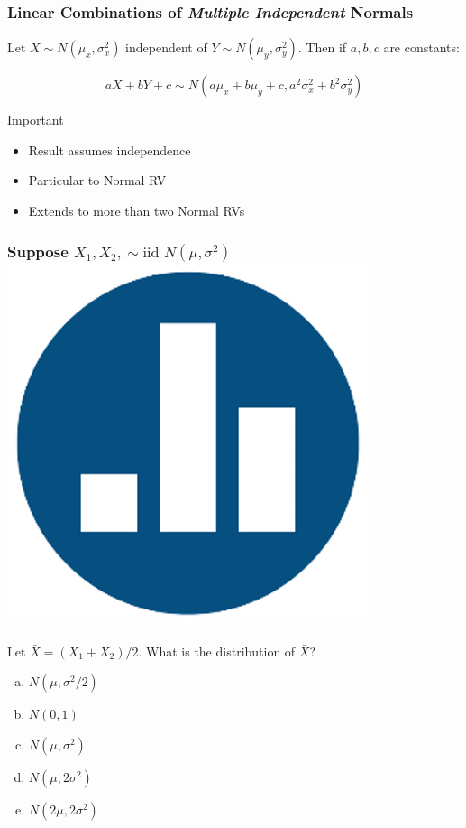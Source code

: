\documentclass[handout]{beamer}
\begin{document}
\begin{frame}
  \frametitle{Linear Combinations of \emph{Multiple Independent} Normals}
Let $X \sim N(\mu_x, \sigma^2_x)$ independent of $Y \sim N(\mu_y, \sigma^2_y)$. Then if $a,b,c$ are constants:

$$\boxed{aX + bY +c \sim N(a\mu_x + b\mu_y + c, a^2 \sigma_x^2 + b^2 \sigma_y^2)}$$



\begin{block}{Important}
	\begin{itemize}
		\item Result assumes independence
		\item Particular to Normal RV 
		\item Extends to more than two Normal RVs
	\end{itemize}
\end{block}

\end{frame}
\begin{frame}
\frametitle{Suppose $X_1, X_2, \sim \mbox{iid } N(\mu, \sigma^2)$ \hfill \includegraphics[scale = 0.05]{./images/clicker}}

Let $\bar{X} = (X_1 + X_2)/2$. What is the distribution of $\bar{X}$?
\begin{enumerate}[(a)]
\item $N(\mu, \sigma^2/2)$
\item $N(0,1)$
\item $N(\mu, \sigma^2)$
\item $N(\mu, 2\sigma^2)$
\item $N(2\mu, 2\sigma^2)$
\end{enumerate}

\end{frame}
\end{document}
